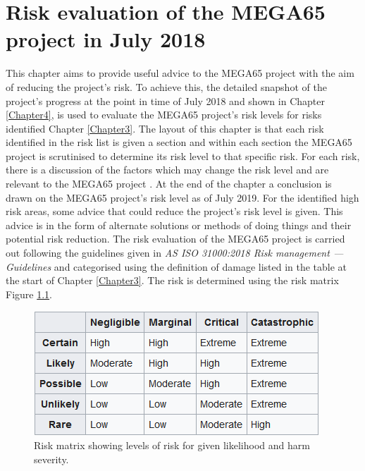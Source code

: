 
\chapter{Risk evaluation of the MEGA65 project in July 2018}
\label{Chapter5}
This chapter aims to provide useful advice to the MEGA65 project with the aim of reducing the project's risk. To achieve this, the detailed snapshot of the project's progress at the point in time of July 2018 and shown in Chapter \ref{Chapter4}, is used to evaluate the MEGA65 project's risk levels for risks identified Chapter \ref{Chapter3}. The layout of this chapter is that each risk identified in the risk list is given a section and within each section the MEGA65 project is scrutinised to determine its risk level to that specific risk. For each risk, there is a discussion of the factors which may change the risk level and are relevant to the MEGA65 project . At the end of the chapter a conclusion is drawn on the MEGA65 project's risk level as of July 2019. For the identified high risk areas, some advice that could reduce the project's risk level is given. This advice is in the form of alternate solutions or methods of doing things and their potential risk reduction. The risk evaluation of the MEGA65 project is carried out following the guidelines given in \textit{AS ISO 31000:2018 Risk management — Guidelines} 
\cite{RN164} and categorised using the definition of damage listed in the table at the start of Chapter \ref{Chapter3}. The risk is determined using the risk matrix Figure \ref{riskmatrix}.

\begin{figure} \begin{center}
\includegraphics[width=.5\linewidth]{pics/riskmatrix} 
\end{center} 
\caption{Risk matrix showing levels of risk for given likelihood and harm severity.\\}
\label{riskmatrix}
\end{figure}

